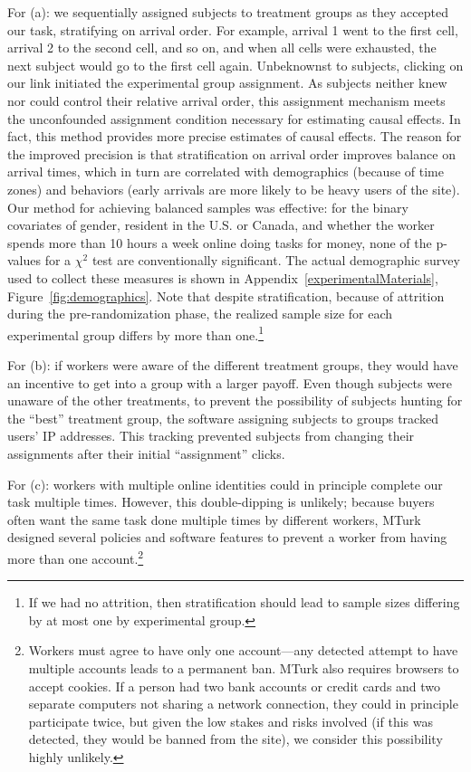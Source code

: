 \documentclass[11pt]{article}
\begin{document}
For (a): we sequentially assigned subjects to treatment groups as they accepted our task, stratifying on arrival order. 
For example, arrival 1 went to the first cell, arrival 2 to the second cell, and so on, and when all cells were exhausted, the next subject would go to the first cell again.
Unbeknownst to subjects, clicking on our link initiated the experimental group assignment. 
As subjects neither knew nor could control their relative arrival order, this assignment mechanism meets the unconfounded assignment condition necessary for estimating causal effects.
In fact, this method provides more precise estimates of causal effects. 
The reason for the improved precision is that stratification on arrival order improves balance on arrival times, which in turn are correlated with demographics (because of time zones) and behaviors (early arrivals are more likely to be heavy users of the site). 
Our method for achieving balanced samples was effective:  
for the binary covariates of gender, resident in the U.S. or Canada, and whether the worker spends more than 10 hours a week online doing tasks for money, none of the p-values for a $\chi^2$ test are conventionally significant. 
The actual demographic survey used to collect these measures is shown in Appendix~\ref{experimentalMaterials}, Figure~\ref{fig:demographics}. 
Note that despite stratification, because of attrition during the pre-randomization phase, the realized sample size for each experimental group differs by more than one.\footnote{
If we had no attrition, then stratification should lead to sample sizes differing by at most one by experimental group. 
}
    
For (b): if workers were aware of the different treatment groups, they would have an incentive to get into a group with a larger payoff.
Even though subjects were unaware of the other treatments, to prevent the possibility of subjects hunting for the ``best'' treatment group, the software assigning subjects to groups tracked users' IP addresses.
This tracking prevented subjects from changing their assignments after their initial ``assignment'' clicks.

For (c): workers with multiple online identities could in principle complete our task multiple times.
However, this double-dipping is unlikely; because buyers often want the same task done multiple times by different workers, MTurk designed several policies and software features to prevent a worker from having more than one account.\footnote{
  Workers must agree to have only one account---any detected attempt to have multiple accounts leads to a permanent ban.
  MTurk also requires browsers to accept cookies.
  If a person had two bank accounts or credit cards and two separate computers not sharing a network connection, they could in principle
  participate twice, but given the low stakes and risks involved (if this was detected, they would be banned from the site), we consider this possibility highly unlikely.
}
\end{document}
